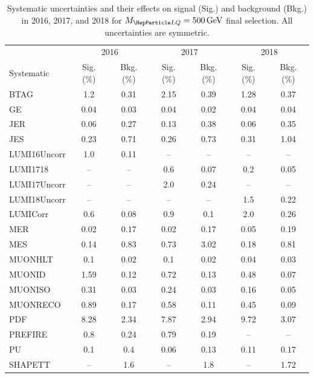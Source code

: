 \begin{table}[H]
	\begin{center}
        \begin{footnotesize}
			\caption{Systematic uncertainties and their effects on signal (Sig.) and background (Bkg.) in 2016, 2017, and 2018 for $\MLQ = \SI{500}{GeV}$ final selection. All uncertainties are symmetric.}
			\begin{tabular}{lcccccc} \hline \hline
				& \multicolumn{2}{c}{2016} & \multicolumn{2}{c}{2017} & \multicolumn{2}{c}{2018} \\
				Systematic & Sig. (\%) & Bkg. (\%) & Sig. (\%) & Bkg. (\%) & Sig. (\%) & Bkg. (\%) \\ \hline
				BTAG &  1.2  &  0.31 &  2.15  &  0.39 &  1.28  &  0.37 \\
				GE &  0.04  &  0.03 &  0.04  &  0.02 &  0.04  &  0.04 \\
				JER &  0.06  &  0.27 &  0.13  &  0.38 &  0.06  &  0.35 \\
				JES &  0.23  &  0.71 &  0.26  &  0.73 &  0.31  &  1.04 \\
				LUMI16Uncorr &  1.0  &  0.11 & -- & -- & -- & -- \\
				LUMI1718 & -- & -- &  0.6  &  0.07 &  0.2  &  0.05 \\
				LUMI17Uncorr & -- & -- &  2.0  &  0.24 & -- & -- \\
				LUMI18Uncorr & -- & -- & -- & -- &  1.5  &  0.22 \\
				LUMICorr &  0.6  &  0.08 &  0.9  &  0.1 &  2.0  &  0.26 \\
				MER &  0.02  &  0.17 &  0.02  &  0.17 &  0.05  &  0.19 \\
				MES &  0.14  &  0.83 &  0.73  &  3.02 &  0.18  &  0.81 \\
				MUONHLT &  0.1  &  0.02 &  0.1  &  0.02 &  0.04  &  0.03 \\
				MUONID &  1.59  &  0.12 &  0.72  &  0.13 &  0.48  &  0.07 \\
				MUONISO &  0.31  &  0.03 &  0.24  &  0.03 &  0.16  &  0.05 \\
				MUONRECO &  0.89  &  0.17 &  0.58  &  0.11 &  0.45  &  0.09 \\
				PDF &  8.28  &  2.34 &  7.87  &  2.94 &  9.72  &  3.07 \\
				PREFIRE &  0.8  &  0.24 &  0.79  &  0.19 & -- & -- \\
				PU &  0.1  &  0.4 &  0.06  &  0.13 &  0.11  &  0.17 \\
				SHAPETT & -- &  1.6 & -- &  1.8 & -- &  1.72 \\

\end{tabular}
\end{footnotesize}
\end{center}
\end{table}
